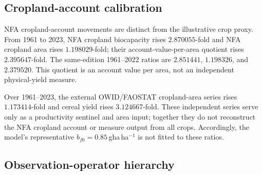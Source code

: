 \documentclass[11pt,a4paper]{article}
\begin{document}
\subsection{Cropland-account calibration}\label{si:cropland}

NFA cropland-account movements are distinct from the illustrative crop proxy. From 1961 to 2023, NFA cropland biocapacity rises $2.870055$-fold and NFA cropland area rises $1.198029$-fold; their account-value-per-area quotient rises $2.395647$-fold. The same-edition 1961--2022 ratios are $2.851441$, $1.198326$, and $2.379520$. This quotient is an account value per area, not an independent physical-yield measure.

Over 1961--2023, the external OWID/FAOSTAT cropland-area series rises $1.173414$-fold and cereal yield rises $3.124667$-fold. These independent series serve only as a productivity sentinel and area input; together they do not reconstruct the NFA cropland account or measure output from all crops. Accordingly, the model's representative $b_{f0}=0.85$\,gha\,ha$^{-1}$ is not fitted to these ratios.

\subsection{Observation-operator hierarchy}\label{si:operator}
\end{document}

